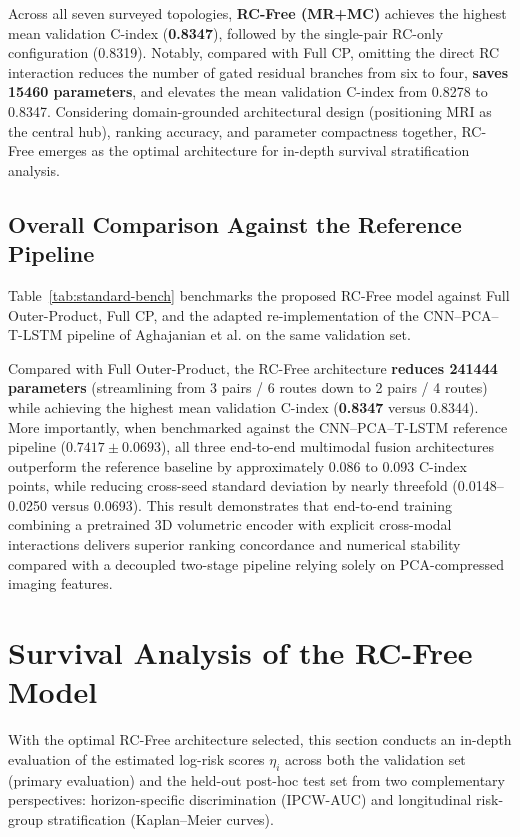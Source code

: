 Across all seven surveyed topologies, \textbf{RC-Free (MR+MC)} achieves the highest mean validation C-index (\textbf{0.8347}), followed by the single-pair RC-only configuration (0.8319). Notably, compared with Full CP, omitting the direct RC interaction reduces the number of gated residual branches from six to four, \textbf{saves 15460 parameters}, and elevates the mean validation C-index from 0.8278 to 0.8347. Considering domain-grounded architectural design (positioning MRI as the central hub), ranking accuracy, and parameter compactness together, RC-Free emerges as the optimal architecture for in-depth survival stratification analysis.

\subsection{Overall Comparison Against the Reference Pipeline}
Table~\ref{tab:standard-bench} benchmarks the proposed RC-Free model against Full Outer-Product, Full CP, and the adapted re-implementation of the CNN--PCA--T-LSTM pipeline of Aghajanian et al. on the same validation set.



Compared with Full Outer-Product, the RC-Free architecture \textbf{reduces 241444 parameters} (streamlining from 3 pairs / 6 routes down to 2 pairs / 4 routes) while achieving the highest mean validation C-index (\textbf{0.8347} versus 0.8344). More importantly, when benchmarked against the CNN--PCA--T-LSTM reference pipeline ($0.7417\pm0.0693$), all three end-to-end multimodal fusion architectures outperform the reference baseline by approximately 0.086 to 0.093 C-index points, while reducing cross-seed standard deviation by nearly threefold (0.0148--0.0250 versus 0.0693). This result demonstrates that end-to-end training combining a pretrained 3D volumetric encoder with explicit cross-modal interactions delivers superior ranking concordance and numerical stability compared with a decoupled two-stage pipeline relying solely on PCA-compressed imaging features.

\section{Survival Analysis of the RC-Free Model}
\label{sec:posthoc-test}
\label{sec:survival-results}
With the optimal RC-Free architecture selected, this section conducts an in-depth evaluation of the estimated log-risk scores $\eta_i$ across both the validation set (primary evaluation) and the held-out post-hoc test set from two complementary perspectives: horizon-specific discrimination (IPCW-AUC) and longitudinal risk-group stratification (Kaplan--Meier curves).

